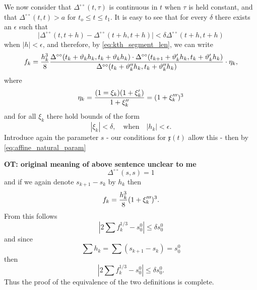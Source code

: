 \documentclass[11pt]{book} \usepackage{amssymb}
\newcommand{\myvec}[1]{\mathfrak{#1}}
\begin{document}
We now consider that $\Delta^{\circ\circ}(t,\tau)$ is continuous in $t$ when
$\tau$ is held constant, and that $\Delta^{\circ\circ}(t,t) > a$ for 
$t_o\leq t\leq t_1$. It is easy to see that for every $\delta$ there exists
an $\epsilon$ such that
\begin{equation}
  \label{eq:delta_bound}
  |\Delta^{\circ\circ}(t,t+h)-\Delta^{\circ\circ}(t+h,t+h)|
  < \delta\Delta^{\circ\circ}(t+h,t+h)
\end{equation}
when $|h|<\epsilon$, and therefore, by \eqref{eq:kth_segment_len}, we can write
\begin{equation}
  \label{eq:kth_segment_len2}
  f_k={h_k^3\over 8}
  {\Delta^{\circ\circ}(t_k+\vartheta_kh_k, t_k+\vartheta_kh_k)
    \cdot \Delta^{\circ\circ}(t_{k+1}+\vartheta'_kh_k, t_k+\vartheta'_kh_k)
    \over 
    \Delta^{\circ\circ}(t_k+\vartheta''_kh_k, t_k+\vartheta''_kh_k)
  }\cdot \eta_k,
\end{equation}
where 
\begin{equation}
  \label{eq:eta_k_def}
  \eta_k={(1=\xi_k)(1+\xi'_k)\over 1+\xi''_k}=(1+\xi'''_k)^3
\end{equation}
and for all $\xi_k$ there hold bounds of the form
\begin{equation}
  \label{eq:xi_bounds}
  |\xi_k|<\delta, \quad \mathrm{when} \quad |h_k|<\epsilon.
\end{equation}
Introduce again the parameter $s$ - our conditions for $\myvec{x}(t)$ allow this
- then by \eqref{eq:affine_natural_param}

{\bf OT: original meaning of above sentence unclear to me}
\begin{equation}
  \Delta^{\circ\circ}(s,s)=1
\end{equation}
and if we again denote $s_{k+1}-s_k$ by $h_k$ then 
\begin{equation}
  \label{eq:f_k_by_h_k}
  f_k={h_k^3\over 8}(1+\xi_k''')^3.
\end{equation}
From this follows
\begin{equation}
  \left|2\sum f_k^{1/3}-s_0^0\right|\leq \delta s_0^0
\end{equation}
and since
\begin{equation}
\sum h_k=\sum (s_{k+1}-s_k)=s_0^0
\end{equation}
then
\begin{equation}
  \left|2\sum f_k^{1/3}-s_0^0\right| \leq \delta s_0^0.
\end{equation}
Thus the proof of the equivalence of the two definitions is complete.
\end{document}
